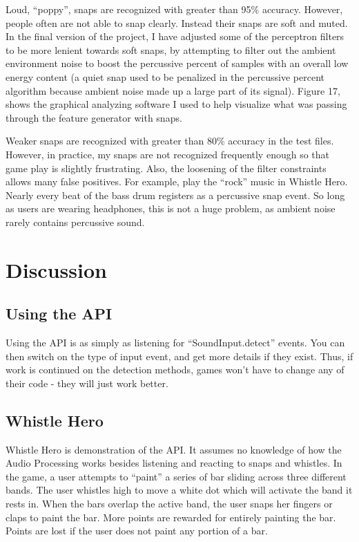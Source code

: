 \documentclass[DIV=calc, paper=a4, fontsize=11pt, twocolumn]{scrartcl}   %
\begin{document}
   \par
   Loud, ``poppy'', snaps are recognized with greater than 95\% accuracy. However, people often are not able to snap clearly. Instead their snaps are soft and muted. In the final version of the project, I have adjusted some of the perceptron filters to be more lenient towards soft snaps, by attempting to filter out the ambient environment noise to boost the percussive percent of samples with an overall low energy content (a quiet snap used to be penalized in the percussive percent algorithm because ambient noise made up a large part of its signal). Figure 17, shows the graphical analyzing software I used to help visualize what was passing through the feature generator with snaps.
   \par Weaker snaps are recognized with greater than 80\% accuracy in the test files. However, in practice, my snaps are not recognized frequently enough so that game play is slightly frustrating. Also, the loosening of the filter constraints allows many false positives. For example, play the ``rock'' music in Whistle Hero. Nearly every beat of the bass drum registers as a percussive snap event. So long as users are wearing headphones, this is not a huge problem, as ambient noise rarely contains percussive sound.



\section{Discussion}
   \subsection{Using the API}
      Using the API is as simply as listening for ``SoundInput.detect'' events. You can then switch on the type of input event, and get more details if they exist. Thus, if work is continued on the detection methods, games won't have to change any of their code - they will just work better.
   \subsection{Whistle Hero}
   Whistle Hero is demonstration of the API. It assumes no knowledge of how the Audio Processing works besides listening and reacting to snaps and whistles. In the game, a user attempts to ``paint'' a series of bar sliding across three different bands. The user whistles high to move a white dot which will activate the band it rests in. When the bars overlap the active band, the user snaps her fingers or claps to paint the bar. More points are rewarded for entirely painting the bar. Points are lost if the user does not paint any portion of a bar.
\end{document}
